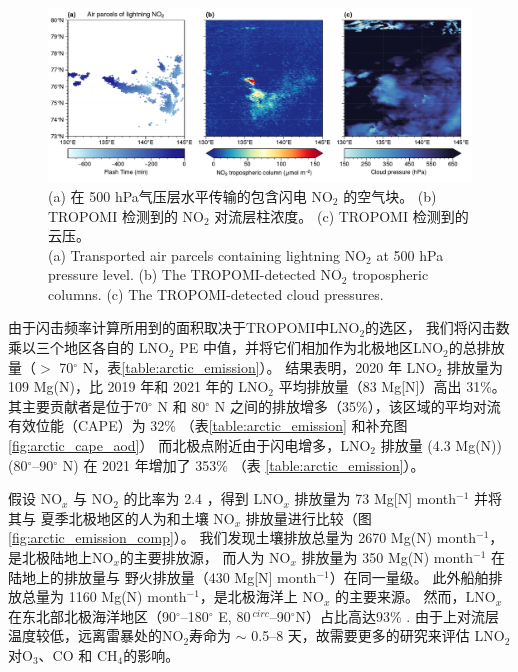 \begin{figure}[!htbp]
\centering
\includegraphics[width=15cm]{./figures/arctic_large_lno2.pdf}
\caption{
(a) 在 500 hPa气压层水平传输的包含闪电 NO$_2$ 的空气块。
(b) TROPOMI 检测到的 NO$_2$ 对流层柱浓度。
(c) TROPOMI 检测到的云压。\\
(a) Transported air parcels containing lightning NO$_2$ at 500 hPa pressure level.
(b) The TROPOMI-detected NO$_2$ tropospheric columns.
(c) The TROPOMI-detected cloud pressures.
}
\label{fig:arctic_large_lno2}
\end{figure}


由于闪击频率计算所用到的面积取决于TROPOMI中LNO$_2$的选区，
我们将闪击数乘以三个地区各自的 LNO$_2$ PE 中值，并将它们相加作为北极地区LNO$_2$的总排放量（$>$ 70$^{\circ}$ N，表\ref{table:arctic_emission}）。
结果表明，2020 年 LNO$_2$ 排放量为 109 Mg(N)，比 2019 年和 2021 年的 LNO$_2$ 平均排放量（83 Mg[N]）高出 31\%。
其主要贡献者是位于70$^{\circ}$ N 和 80$^{\circ}$ N 之间的排放增多（35\%），该区域的平均对流有效位能（CAPE）为 32\% （表\ref{table:arctic_emission} 和补充图 \ref{fig:arctic_cape_aod}）
而北极点附近由于闪电增多，LNO$_2$ 排放量 (4.3 Mg(N)) (80$^{\circ}$--90$^{\circ}$ N) 在 2021 年增加了 353\% （表 \ref{table:arctic_emission}）。

假设 NO$_x$ 与 NO$_2$ 的比率为 2.4 \citep{Silvern.2018}，得到 LNO$_x$ 排放量为 73 Mg[N] month$^{-1}$ 并将其与 夏季北极地区的人为和土壤 NO$_x$ 排放量进行比较（图\ref{fig:arctic_emission_comp}）。
我们发现土壤排放总量为 2670 Mg(N) month$^{-1}$，是北极陆地上NO$_x$的主要排放源，
而人为 NO$_x$ 排放量为 350 Mg(N) month$^{-1 }$ 在陆地上的排放量与 野火排放量（430 Mg[N] month$^{-1}$）在同一量级。
此外船舶排放总量为 1160 Mg(N) month$^{-1}$，是北极海洋上 NO$_x$ 的主要来源。
然而，LNO$_x$在东北部北极海洋地区（90$^{\circ}$--180$^{\circ}$ E, 80$^{\ circ}$--90$^{\circ}$N）占比高达93\% .
由于上对流层温度较低，远离雷暴处的NO$_2$寿命为 $\sim$ 0.5--8 天\citep{Schumann.2007,Nault.2017}，故需要更多的研究来评估 LNO$_2$对O$_3$、CO 和 CH$_4$的影响。


